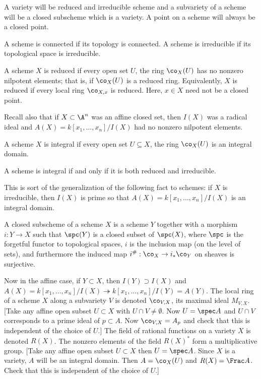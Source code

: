 A variety will be reduced and irreducible scheme and a subvariety of a scheme will be a closed subscheme which is a variety. A point on a scheme will always be a closed point. 


\begin{dfn}
A scheme is connected if its topology is connected. A scheme is irreducible if its topological space is irreducible. 
\end{dfn}


\begin{dfn}[Reduced]
A scheme $X$ is reduced if every open set $U$, the ring $\co_X(U)$ has no nonzero nilpotent elements; that is, if $\co_X(U)$ is a reduced ring. Equivalently, $X$ is reduced if every local ring $\co_{X,x}$ is reduced. Here, $x \in X$ need not be a closed point. 
\end{dfn}


Recall also that if $X \subset \A^n$ was an affine closed set, then $I(X)$ was a radical ideal and $A(X)=k[x_1,\ldots,x_n]/I(X)$ had no nonzero nilpotent elements. 


\begin{dfn}[Integral]
A scheme $X$ is integral if every open set $U \subseteq X$, the ring $\co_X(U)$ is an integral domain. 
\end{dfn}


\begin{prop}
A scheme is integral if and only if it is both reduced and irreducible. 
\end{prop}


This is sort of the generalization of the following fact to schemes: if $X$ is irreducible, then $I(X)$ is prime so that $A(X)=k[x_1,\ldots,x_n]/I(X)$ is an integral domain. 


\begin{dfn}
A closed subscheme of a scheme $X$ is a scheme $Y$ together with a morphism $i: Y \to X$ such that $\spc(Y)$ is a closed subset of $\spc(X)$, where $\spc$ is the forgetful functor to topological spaces, $i$ is the inclusion map (on the level of sets), and furthermore the induced map $i^\#: \co_X \to i_* \co_Y$ on sheaves is surjective. 
\end{dfn}


Now in the affine case, if $Y \subset X$, then $I(Y) \supset I(X)$ and $A(X)=k[x_1,\ldots,x_n]/I(X) \twoheadrightarrow k[x_1,\ldots,x_n]/I(Y)=A(Y)$. The local ring of a scheme $X$ along a subvariety $V$ is denoted $\co_{V,X}$, its maximal ideal $M_{V,X}$. [Take any affine open subset $U \subset X$ with $U \cap V \neq \emptyset$. Now $U=\spec A$ and $U \cap V$ corresponds to a prime ideal of $p \subset A$. Now $\co_{V,X}= A_p$ and check that this is independent of the choice of $U$.] The field of rational functions on a variety $X$ is denoted $R(X)$. The nonzero elements of the field $R(X)^*$ form a multiplicative group. [Take any affine open subset $U \subset X$ then $U=\spec A$. Since $X$ is a variety, $A$ will be an integral domain. Then $A=\co_X(U)$ and $R(X)=\Frac A$. Check that this is independent of the choice of $U$.]


